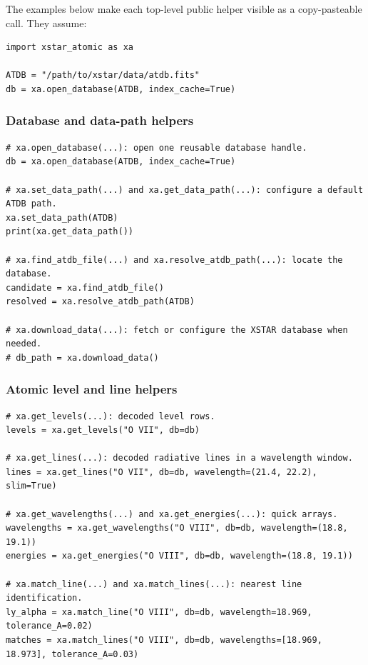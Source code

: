 \documentclass[11pt]{article}
\begin{document}
The examples below make each top-level public helper visible as a copy-pasteable call. They assume:

\begin{lstlisting}[style=ctpython]
import xstar_atomic as xa

ATDB = "/path/to/xstar/data/atdb.fits"
db = xa.open_database(ATDB, index_cache=True)
\end{lstlisting}

\subsubsection{Database and data-path helpers}

\begin{lstlisting}[style=ctpython]
# xa.open_database(...): open one reusable database handle.
db = xa.open_database(ATDB, index_cache=True)

# xa.set_data_path(...) and xa.get_data_path(...): configure a default ATDB path.
xa.set_data_path(ATDB)
print(xa.get_data_path())

# xa.find_atdb_file(...) and xa.resolve_atdb_path(...): locate the database.
candidate = xa.find_atdb_file()
resolved = xa.resolve_atdb_path(ATDB)

# xa.download_data(...): fetch or configure the XSTAR database when needed.
# db_path = xa.download_data()
\end{lstlisting}

\subsubsection{Atomic level and line helpers}

\begin{lstlisting}[style=ctpython]
# xa.get_levels(...): decoded level rows.
levels = xa.get_levels("O VII", db=db)

# xa.get_lines(...): decoded radiative lines in a wavelength window.
lines = xa.get_lines("O VII", db=db, wavelength=(21.4, 22.2), slim=True)

# xa.get_wavelengths(...) and xa.get_energies(...): quick arrays.
wavelengths = xa.get_wavelengths("O VIII", db=db, wavelength=(18.8, 19.1))
energies = xa.get_energies("O VIII", db=db, wavelength=(18.8, 19.1))

# xa.match_line(...) and xa.match_lines(...): nearest line identification.
ly_alpha = xa.match_line("O VIII", db=db, wavelength=18.969, tolerance_A=0.02)
matches = xa.match_lines("O VIII", db=db, wavelengths=[18.969, 18.973], tolerance_A=0.03)
\end{lstlisting}
\end{document}
